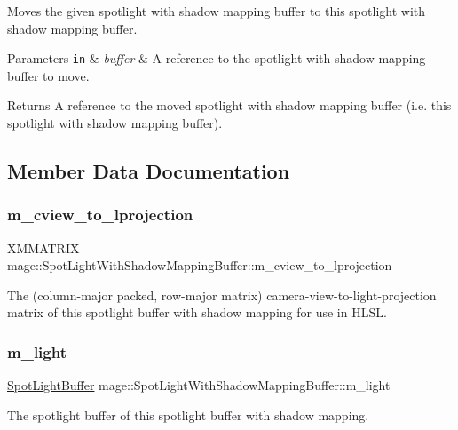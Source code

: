 Moves the given spotlight with shadow mapping buffer to this spotlight with shadow mapping buffer.


\begin{DoxyParams}[1]{Parameters}
\mbox{\tt in}  & {\em buffer} & A reference to the spotlight with shadow mapping buffer to move. \\
\hline
\end{DoxyParams}
\begin{DoxyReturn}{Returns}
A reference to the moved spotlight with shadow mapping buffer (i.\+e. this spotlight with shadow mapping buffer). 
\end{DoxyReturn}


\subsection{Member Data Documentation}
\hypertarget{structmage_1_1_spot_light_with_shadow_mapping_buffer_a9f265c3662e441dc1d32dd793198ca5f}{}\label{structmage_1_1_spot_light_with_shadow_mapping_buffer_a9f265c3662e441dc1d32dd793198ca5f} 
\subsubsection{\texorpdfstring{m\+\_\+cview\+\_\+to\+\_\+lprojection}{m\_cview\_to\_lprojection}}
{\footnotesize\ttfamily X\+M\+M\+A\+T\+R\+IX mage\+::\+Spot\+Light\+With\+Shadow\+Mapping\+Buffer\+::m\+\_\+cview\+\_\+to\+\_\+lprojection}

The (column-\/major packed, row-\/major matrix) camera-\/view-\/to-\/light-\/projection matrix of this spotlight buffer with shadow mapping for use in H\+L\+SL. \hypertarget{structmage_1_1_spot_light_with_shadow_mapping_buffer_adf2a7b3790e5ca40141a3bfbd9de19bb}{}\label{structmage_1_1_spot_light_with_shadow_mapping_buffer_adf2a7b3790e5ca40141a3bfbd9de19bb} 
\subsubsection{\texorpdfstring{m\+\_\+light}{m\_light}}
{\footnotesize\ttfamily \hyperlink{structmage_1_1_spot_light_buffer}{Spot\+Light\+Buffer} mage\+::\+Spot\+Light\+With\+Shadow\+Mapping\+Buffer\+::m\+\_\+light}

The spotlight buffer of this spotlight buffer with shadow mapping. 